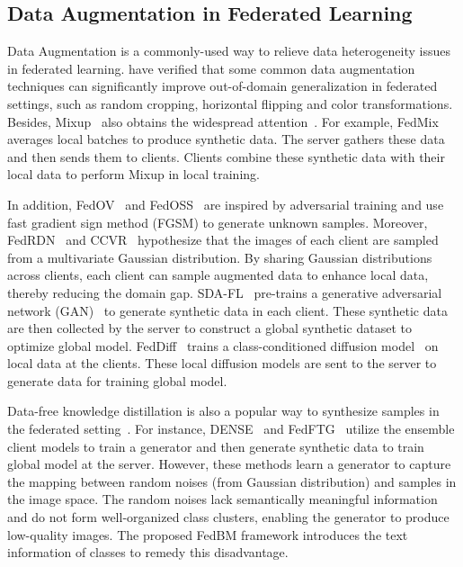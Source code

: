 \subsection{Data Augmentation in Federated Learning}
Data Augmentation is a commonly-used way to relieve data heterogeneity issues in federated learning. 
\cite{de2022mitigating} have verified that some common data augmentation techniques can significantly improve out-of-domain generalization in federated settings, such as random cropping,  horizontal flipping and color transformations. Besides, Mixup~\cite{zhang2017mixup} also obtains the widespread attention~\cite{guo2023fedbr, yoon2021fedmix, shin2020xor}. For example, FedMix~\cite{yoon2021fedmix} averages local batches to produce synthetic data. The server gathers these data and then sends them to clients. Clients combine these synthetic data with their local data to perform Mixup in local training.

In addition, FedOV~\cite{diao2023towards} and FedOSS~\cite{FedOSS} are inspired by adversarial training and use fast gradient sign method (FGSM) to generate unknown samples.
Moreover, FedRDN~\cite{yan2023simple} and CCVR~\cite{luo2021no} hypothesize that the images of each client are sampled from a multivariate Gaussian distribution. By sharing Gaussian distributions across clients, each client can sample augmented data to enhance local data, thereby reducing the domain gap.
SDA-FL~\cite{li2022federated} pre-trains a generative adversarial network (GAN)~\cite{goodfellow2014generative} to generate synthetic data in each client. These synthetic data are then collected by the server to construct a global synthetic dataset to optimize global model. 
FedDiff~\cite{mendieta2024navigating} trains a class-conditioned diffusion model~\cite{ho2020denoising} on local data at the clients. These local diffusion models are sent to the server to generate data for training global model.

Data-free knowledge distillation is also a popular way to synthesize samples in the federated setting~\cite{zhang2022fine, zhang2022dense, wang2024dfrd}. For instance, DENSE~\cite{zhang2022dense} and FedFTG~\cite{zhang2022fine} utilize the ensemble client models to train a generator and then generate synthetic data to train global model at the server. However, these methods learn a generator to capture the mapping between random noises (from Gaussian distribution) and samples in the image space. The random noises lack semantically meaningful information and do not form well-organized class clusters, enabling the generator to produce low-quality images. The proposed FedBM framework introduces the text information of classes to remedy this disadvantage.